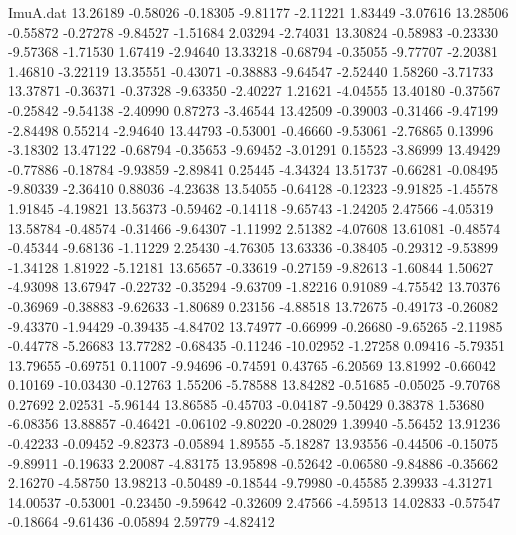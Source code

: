 \begin{filecontents}{ImuA.dat}
  13.26189   -0.58026   -0.18305   -9.81177   -2.11221    1.83449   -3.07616
  13.28506   -0.55872   -0.27278   -9.84527   -1.51684    2.03294   -2.74031
  13.30824   -0.58983   -0.23330   -9.57368   -1.71530    1.67419   -2.94640
  13.33218   -0.68794   -0.35055   -9.77707   -2.20381    1.46810   -3.22119
  13.35551   -0.43071   -0.38883   -9.64547   -2.52440    1.58260   -3.71733
  13.37871   -0.36371   -0.37328   -9.63350   -2.40227    1.21621   -4.04555
  13.40180   -0.37567   -0.25842   -9.54138   -2.40990    0.87273   -3.46544
  13.42509   -0.39003   -0.31466   -9.47199   -2.84498    0.55214   -2.94640
  13.44793   -0.53001   -0.46660   -9.53061   -2.76865    0.13996   -3.18302
  13.47122   -0.68794   -0.35653   -9.69452   -3.01291    0.15523   -3.86999
  13.49429   -0.77886   -0.18784   -9.93859   -2.89841    0.25445   -4.34324
  13.51737   -0.66281   -0.08495   -9.80339   -2.36410    0.88036   -4.23638
  13.54055   -0.64128   -0.12323   -9.91825   -1.45578    1.91845   -4.19821
  13.56373   -0.59462   -0.14118   -9.65743   -1.24205    2.47566   -4.05319
  13.58784   -0.48574   -0.31466   -9.64307   -1.11992    2.51382   -4.07608
  13.61081   -0.48574   -0.45344   -9.68136   -1.11229    2.25430   -4.76305
  13.63336   -0.38405   -0.29312   -9.53899   -1.34128    1.81922   -5.12181
  13.65657   -0.33619   -0.27159   -9.82613   -1.60844    1.50627   -4.93098
  13.67947   -0.22732   -0.35294   -9.63709   -1.82216    0.91089   -4.75542
  13.70376   -0.36969   -0.38883   -9.62633   -1.80689    0.23156   -4.88518
  13.72675   -0.49173   -0.26082   -9.43370   -1.94429   -0.39435   -4.84702
  13.74977   -0.66999   -0.26680   -9.65265   -2.11985   -0.44778   -5.26683
  13.77282   -0.68435   -0.11246  -10.02952   -1.27258    0.09416   -5.79351
  13.79655   -0.69751    0.11007   -9.94696   -0.74591    0.43765   -6.20569
  13.81992   -0.66042    0.10169  -10.03430   -0.12763    1.55206   -5.78588
  13.84282   -0.51685   -0.05025   -9.70768    0.27692    2.02531   -5.96144
  13.86585   -0.45703   -0.04187   -9.50429    0.38378    1.53680   -6.08356
  13.88857   -0.46421   -0.06102   -9.80220   -0.28029    1.39940   -5.56452
  13.91236   -0.42233   -0.09452   -9.82373   -0.05894    1.89555   -5.18287
  13.93556   -0.44506   -0.15075   -9.89911   -0.19633    2.20087   -4.83175
  13.95898   -0.52642   -0.06580   -9.84886   -0.35662    2.16270   -4.58750
  13.98213   -0.50489   -0.18544   -9.79980   -0.45585    2.39933   -4.31271
  14.00537   -0.53001   -0.23450   -9.59642   -0.32609    2.47566   -4.59513
  14.02833   -0.57547   -0.18664   -9.61436   -0.05894    2.59779   -4.82412

\end{filecontents}
